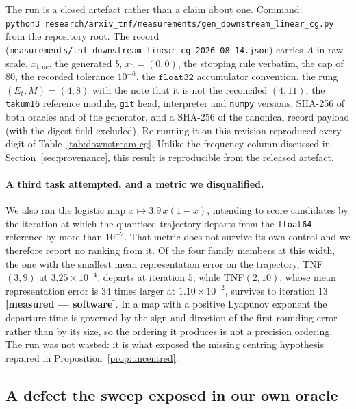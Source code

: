\documentclass[11pt]{article}
\theoremstyle{definition}
\begin{document}
\begin{sloppypar}
The run is a closed artefact rather than a claim about one. Command:
\texttt{python3}\ \texttt{research/}\allowbreak\texttt{arxiv\_tnf/}\allowbreak\texttt{measurements/}\allowbreak\texttt{gen\_downstream\_}\allowbreak\texttt{linear\_cg.py}
from the repository root. The record
(\texttt{measurements/}\allowbreak\texttt{tnf\_downstream\_}\allowbreak\texttt{linear\_cg\_}\allowbreak\texttt{2026-08-14.json}) carries $A$ in
raw scale, $x_{\text{true}}$, the generated $b$, $x_0 = (0,0)$, the stopping rule
verbatim, the cap of $80$, the recorded tolerance $10^{-6}$, the $\texttt{float32}$
accumulator convention, the rung $(E_t,M)=(4,8)$ with the note that it is not the
reconciled $(4,11)$, the \texttt{takum16} reference module, \texttt{git} head,
interpreter and \texttt{numpy} versions, SHA-256 of both oracles and of the
generator, and a SHA-256 of the canonical record payload (with the digest field
excluded). Re-running it on this revision reproduced
every digit of Table~\ref{tab:downstream-cg}. Unlike the frequency column discussed
in Section~\ref{sec:provenance}, this result is reproducible from the released
artefact.
\end{sloppypar}

\paragraph{A third task attempted, and a metric we disqualified.} We also ran the
logistic map $x \mapsto 3.9\,x(1-x)$, intending to score candidates by the
iteration at which the quantised trajectory departs from the \texttt{float64}
reference by more than $10^{-2}$. That metric does not survive its own control and
we therefore report no ranking from it. Of the four family members at this width,
the one with the smallest mean representation error on the trajectory, TNF$(3,9)$
at $3.25\times10^{-4}$, departs at iteration $5$, while TNF$(2,10)$, whose mean
representation error is $34$ times larger at $1.10\times10^{-2}$, survives to
iteration $13$ \textbf{[measured --- software]}. In a map with a positive Lyapunov
exponent the departure time is governed by the sign and direction of the first
rounding error rather than by its size, so the ordering it produces is not a
precision ordering. The run was not wasted: it is what exposed the missing
centring hypothesis repaired in Proposition~\ref{prop:uncentred}.

\subsection{A defect the sweep exposed in our own oracle}
\label{sec:oracledefect}
\end{document}
